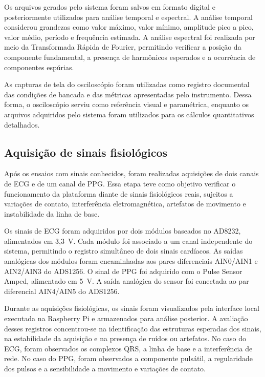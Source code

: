 \documentclass[a4paper,12pt]{fcte}
\begin{document}
Os arquivos gerados pelo sistema foram salvos em formato digital e posteriormente utilizados para análise temporal e espectral. A análise temporal considerou grandezas como valor máximo, valor mínimo, amplitude pico a pico, valor médio, período e frequência estimada. A análise espectral foi realizada por meio da Transformada Rápida de Fourier, permitindo verificar a posição da componente fundamental, a presença de harmônicos esperados e a ocorrência de componentes espúrias.

As capturas de tela do osciloscópio foram utilizadas como registro documental das condições de bancada e das métricas apresentadas pelo instrumento. Dessa forma, o osciloscópio serviu como referência visual e paramétrica, enquanto os arquivos adquiridos pelo sistema foram utilizados para os cálculos quantitativos detalhados.

\subsection{Aquisição de sinais fisiológicos}
\label{subsec:aquisicao_fisiologica}

Após os ensaios com sinais conhecidos, foram realizadas aquisições de dois canais de ECG e de um canal de PPG. Essa etapa teve como objetivo verificar o funcionamento da plataforma diante de sinais fisiológicos reais, sujeitos a variações de contato, interferência eletromagnética, artefatos de movimento e instabilidade da linha de base.

Os sinais de ECG foram adquiridos por dois módulos baseados no AD8232, alimentados em 3,3~V. Cada módulo foi associado a um canal independente do sistema, permitindo o registro simultâneo de dois sinais cardíacos. As saídas analógicas dos módulos foram encaminhadas aos pares diferenciais AIN0/AIN1 e AIN2/AIN3 do ADS1256. O sinal de PPG foi adquirido com o Pulse Sensor Amped, alimentado em 5~V. A saída analógica do sensor foi conectada ao par diferencial AIN4/AIN5 do ADS1256.

Durante as aquisições fisiológicas, os sinais foram visualizados pela interface local executada na Raspberry Pi e armazenados para análise posterior. A avaliação desses registros concentrou-se na identificação das estruturas esperadas dos sinais, na estabilidade da aquisição e na presença de ruídos ou artefatos. No caso do ECG, foram observados os complexos QRS, a linha de base e a interferência de rede. No caso do PPG, foram observados a componente pulsátil, a regularidade dos pulsos e a sensibilidade a movimento e variações de contato.
\end{document}
